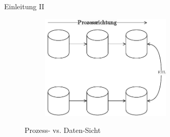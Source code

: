 \begin{frame}{Einleitung II}
    \vspace{1em}

    \begin{figure}
        \centering
        \begin{subfigure}{0.5\textwidth}
            \centering
            \includegraphics[height=5cm]{./assets/process_view.drawio.pdf}
        \end{subfigure}
        \caption{Prozess- vs. Daten-Sicht}
    \end{figure}
\end{frame}



